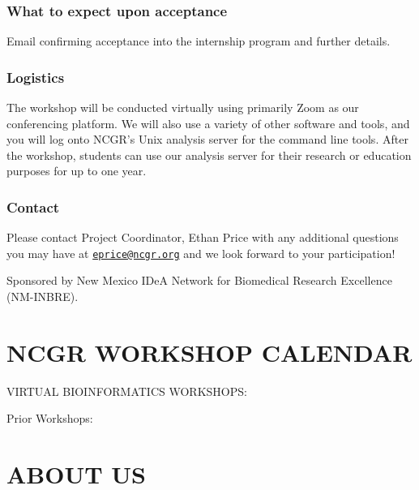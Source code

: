 \documentclass[
]{book}
\begin{document}
\hypertarget{what-to-expect-upon-acceptance}{%
\subsection*{What to expect upon acceptance}\label{what-to-expect-upon-acceptance}}

Email confirming acceptance into the internship program and further details.

\hypertarget{logistics}{%
\subsection*{Logistics}\label{logistics}}

The workshop will be conducted virtually using primarily Zoom as our conferencing platform. We will also use a variety of other software and tools, and you will log onto NCGR's Unix analysis server for the command line tools. After the workshop, students can use our analysis server for their research or education purposes for up to one year.

\hypertarget{contact}{%
\subsection*{Contact}\label{contact}}

Please contact Project Coordinator, Ethan Price with any additional questions you may have at \href{mailto:eprice@ncgr.org}{\nolinkurl{eprice@ncgr.org}} and we look forward to your participation!

Sponsored by New Mexico IDeA Network for Biomedical Research Excellence (NM-INBRE).

\hypertarget{ncgr-workshop-calendar}{%
\chapter*{NCGR WORKSHOP CALENDAR}\label{ncgr-workshop-calendar}}

VIRTUAL BIOINFORMATICS WORKSHOPS:

Prior Workshops:

\hypertarget{about-us}{%
\chapter*{ABOUT US}\label{about-us}}
\end{document}
